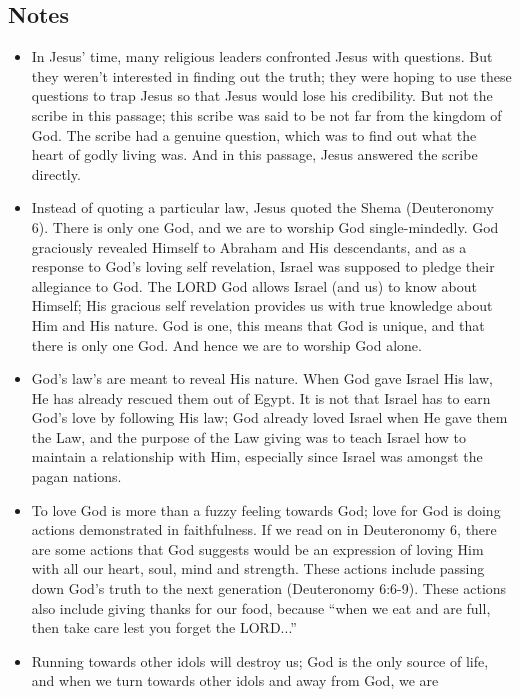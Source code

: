 \subsection*{Notes}
\begin{itemize}
  \item{In Jesus' time, many religious leaders confronted Jesus with
  questions.  But they weren't interested in finding out the truth; they were
  hoping to use these questions to trap Jesus so that Jesus would lose his
  credibility.  But not the scribe in this passage; this scribe was said to
  be not far from the kingdom of God.  The scribe had a genuine question,
  which was to find out what the heart of godly living was.  And in this
  passage, Jesus answered the scribe directly.}
  \item{Instead of quoting a particular law, Jesus quoted the Shema
  (Deuteronomy 6).  There is only one God, and we are to worship God
  single-mindedly.  God graciously revealed Himself to Abraham and His
  descendants, and as a response to God's loving self revelation, Israel was
  supposed to pledge their allegiance to God.  The LORD God allows Israel
  (and us) to know about Himself; His gracious self revelation provides us
  with true knowledge about Him and His nature.  God is one, this means that
  God is unique, and that there is only one God.  And hence we are to worship
  God alone.}
  \item{God's law's are meant to reveal His nature.  When God gave Israel His
  law, He has already rescued them out of Egypt.  It is not that Israel has
  to earn God's love by following His law; God already loved Israel when He
  gave them the Law, and the purpose of the Law giving was to teach Israel
  how to maintain a relationship with Him, especially since Israel was
  amongst the pagan nations.}
  \item{To love God is more than a fuzzy feeling towards God; love for God is
  doing actions demonstrated in faithfulness.  If we read on in Deuteronomy
  6, there are some actions that God suggests would be an expression of
  loving Him with all our heart, soul, mind and strength.  These actions
  include passing down God's truth to the next generation (Deuteronomy
  6:6-9).  These actions also include giving thanks for our food, because
  ``when we eat and are full, then take care lest you forget the LORD...''}
  \item{Running towards other idols will destroy us; God is the only source
  of life, and when we turn towards other idols and away from God, we are
}
\end{itemize}

